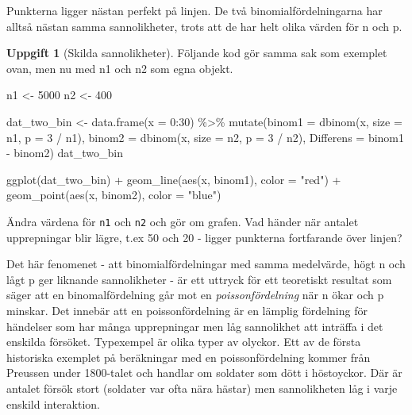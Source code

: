 \documentclass[
]{book}
\newenvironment{Shaded}{\begin{snugshade}}{\end{snugshade}}
\newcommand{\AttributeTok}[1]{\textcolor[rgb]{0.77,0.63,0.00}{#1}}
\newcommand{\DecValTok}[1]{\textcolor[rgb]{0.00,0.00,0.81}{#1}}
\newcommand{\FunctionTok}[1]{\textcolor[rgb]{0.00,0.00,0.00}{#1}}
\newcommand{\NormalTok}[1]{#1}
\newcommand{\OtherTok}[1]{\textcolor[rgb]{0.56,0.35,0.01}{#1}}
\newcommand{\SpecialCharTok}[1]{\textcolor[rgb]{0.00,0.00,0.00}{#1}}
\newcommand{\StringTok}[1]{\textcolor[rgb]{0.31,0.60,0.02}{#1}}
\theoremstyle{definition}
\theoremstyle{definition}
\theoremstyle{definition}
\newtheorem{exercise}{Uppgift}[chapter]
\theoremstyle{definition}
\theoremstyle{remark}
\begin{document}
Punkterna ligger nästan perfekt på linjen. De två binomialfördelningarna har alltså nästan samma sannolikheter, trots att de har helt olika värden för n och p.

\begin{exercise}[Skilda sannolikheter]
Följande kod gör samma sak som exemplet ovan, men nu med n1 och n2 som egna objekt.

\begin{Shaded}
\begin{Highlighting}[]
\NormalTok{n1 }\OtherTok{\textless{}{-}} \DecValTok{5000}
\NormalTok{n2 }\OtherTok{\textless{}{-}} \DecValTok{400}

\NormalTok{dat\_two\_bin }\OtherTok{\textless{}{-}} \FunctionTok{data.frame}\NormalTok{(}\AttributeTok{x =} \DecValTok{0}\SpecialCharTok{:}\DecValTok{30}\NormalTok{) }\SpecialCharTok{\%\textgreater{}\%} 
  \FunctionTok{mutate}\NormalTok{(}\AttributeTok{binom1 =} \FunctionTok{dbinom}\NormalTok{(x, }\AttributeTok{size =}\NormalTok{ n1, }\AttributeTok{p =} \DecValTok{3} \SpecialCharTok{/}\NormalTok{ n1),}
         \AttributeTok{binom2 =} \FunctionTok{dbinom}\NormalTok{(x, }\AttributeTok{size =}\NormalTok{ n2, }\AttributeTok{p =} \DecValTok{3} \SpecialCharTok{/}\NormalTok{ n2),}
         \AttributeTok{Differens =}\NormalTok{ binom1 }\SpecialCharTok{{-}}\NormalTok{ binom2)}
\NormalTok{dat\_two\_bin}

\FunctionTok{ggplot}\NormalTok{(dat\_two\_bin) }\SpecialCharTok{+}
  \FunctionTok{geom\_line}\NormalTok{(}\FunctionTok{aes}\NormalTok{(x, binom1), }\AttributeTok{color =} \StringTok{"red"}\NormalTok{) }\SpecialCharTok{+}
  \FunctionTok{geom\_point}\NormalTok{(}\FunctionTok{aes}\NormalTok{(x, binom2), }\AttributeTok{color =} \StringTok{"blue"}\NormalTok{)}
\end{Highlighting}
\end{Shaded}

Ändra värdena för \texttt{n1} och \texttt{n2} och gör om grafen. Vad händer när antalet upprepningar blir lägre, t.ex 50 och 20 - ligger punkterna fortfarande över linjen?
\end{exercise}

Det här fenomenet - att binomialfördelningar med samma medelvärde, högt n och lågt p ger liknande sannolikheter - är ett uttryck för ett teoretiskt resultat som säger att en binomalfördelning går mot en \emph{poissonfördelning} när n ökar och p minskar. Det innebär att en poissonfördelning är en lämplig fördelning för händelser som har många upprepningar men låg sannolikhet att inträffa i det enskilda försöket. Typexempel är olika typer av olyckor. Ett av de första historiska exemplet på beräkningar med en poissonfördelning kommer från Preussen under 1800-talet och handlar om soldater som dött i höstoyckor. Där är antalet försök stort (soldater var ofta nära hästar) men sannolikheten låg i varje enskild interaktion.
\end{document}
